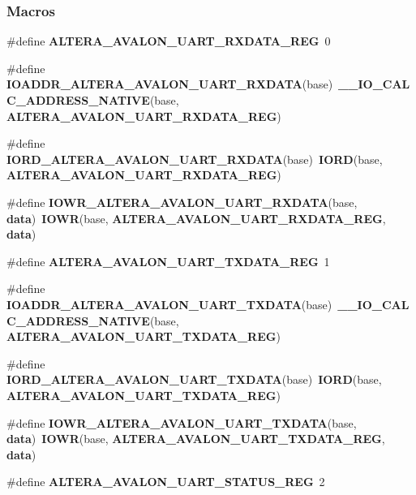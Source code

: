 \subsubsection*{Macros}
\begin{DoxyCompactItemize}
\item 
\#define {\bf A\+L\+T\+E\+R\+A\+\_\+\+A\+V\+A\+L\+O\+N\+\_\+\+U\+A\+R\+T\+\_\+\+R\+X\+D\+A\+T\+A\+\_\+\+R\+EG}~0
\item 
\#define {\bf I\+O\+A\+D\+D\+R\+\_\+\+A\+L\+T\+E\+R\+A\+\_\+\+A\+V\+A\+L\+O\+N\+\_\+\+U\+A\+R\+T\+\_\+\+R\+X\+D\+A\+TA}(base)~{\bf \+\_\+\+\_\+\+I\+O\+\_\+\+C\+A\+L\+C\+\_\+\+A\+D\+D\+R\+E\+S\+S\+\_\+\+N\+A\+T\+I\+VE}(base, {\bf A\+L\+T\+E\+R\+A\+\_\+\+A\+V\+A\+L\+O\+N\+\_\+\+U\+A\+R\+T\+\_\+\+R\+X\+D\+A\+T\+A\+\_\+\+R\+EG})
\item 
\#define {\bf I\+O\+R\+D\+\_\+\+A\+L\+T\+E\+R\+A\+\_\+\+A\+V\+A\+L\+O\+N\+\_\+\+U\+A\+R\+T\+\_\+\+R\+X\+D\+A\+TA}(base)~{\bf I\+O\+RD}(base, {\bf A\+L\+T\+E\+R\+A\+\_\+\+A\+V\+A\+L\+O\+N\+\_\+\+U\+A\+R\+T\+\_\+\+R\+X\+D\+A\+T\+A\+\_\+\+R\+EG})
\item 
\#define {\bf I\+O\+W\+R\+\_\+\+A\+L\+T\+E\+R\+A\+\_\+\+A\+V\+A\+L\+O\+N\+\_\+\+U\+A\+R\+T\+\_\+\+R\+X\+D\+A\+TA}(base,  {\bf data})~{\bf I\+O\+WR}(base, {\bf A\+L\+T\+E\+R\+A\+\_\+\+A\+V\+A\+L\+O\+N\+\_\+\+U\+A\+R\+T\+\_\+\+R\+X\+D\+A\+T\+A\+\_\+\+R\+EG}, {\bf data})
\item 
\#define {\bf A\+L\+T\+E\+R\+A\+\_\+\+A\+V\+A\+L\+O\+N\+\_\+\+U\+A\+R\+T\+\_\+\+T\+X\+D\+A\+T\+A\+\_\+\+R\+EG}~1
\item 
\#define {\bf I\+O\+A\+D\+D\+R\+\_\+\+A\+L\+T\+E\+R\+A\+\_\+\+A\+V\+A\+L\+O\+N\+\_\+\+U\+A\+R\+T\+\_\+\+T\+X\+D\+A\+TA}(base)~{\bf \+\_\+\+\_\+\+I\+O\+\_\+\+C\+A\+L\+C\+\_\+\+A\+D\+D\+R\+E\+S\+S\+\_\+\+N\+A\+T\+I\+VE}(base, {\bf A\+L\+T\+E\+R\+A\+\_\+\+A\+V\+A\+L\+O\+N\+\_\+\+U\+A\+R\+T\+\_\+\+T\+X\+D\+A\+T\+A\+\_\+\+R\+EG})
\item 
\#define {\bf I\+O\+R\+D\+\_\+\+A\+L\+T\+E\+R\+A\+\_\+\+A\+V\+A\+L\+O\+N\+\_\+\+U\+A\+R\+T\+\_\+\+T\+X\+D\+A\+TA}(base)~{\bf I\+O\+RD}(base, {\bf A\+L\+T\+E\+R\+A\+\_\+\+A\+V\+A\+L\+O\+N\+\_\+\+U\+A\+R\+T\+\_\+\+T\+X\+D\+A\+T\+A\+\_\+\+R\+EG})
\item 
\#define {\bf I\+O\+W\+R\+\_\+\+A\+L\+T\+E\+R\+A\+\_\+\+A\+V\+A\+L\+O\+N\+\_\+\+U\+A\+R\+T\+\_\+\+T\+X\+D\+A\+TA}(base,  {\bf data})~{\bf I\+O\+WR}(base, {\bf A\+L\+T\+E\+R\+A\+\_\+\+A\+V\+A\+L\+O\+N\+\_\+\+U\+A\+R\+T\+\_\+\+T\+X\+D\+A\+T\+A\+\_\+\+R\+EG}, {\bf data})
\item 
\#define {\bf A\+L\+T\+E\+R\+A\+\_\+\+A\+V\+A\+L\+O\+N\+\_\+\+U\+A\+R\+T\+\_\+\+S\+T\+A\+T\+U\+S\+\_\+\+R\+EG}~2

\end{DoxyCompactItemize}
